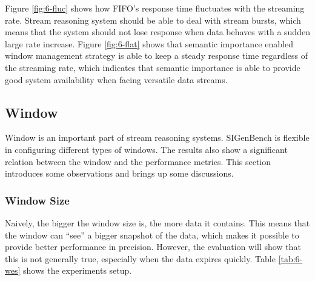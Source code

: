 Figure \ref{fig:6-fluc} shows how FIFO's response time fluctuates with the streaming rate.
Stream reasoning system should be able to deal with stream bursts, which means that the system should not lose response when data behaves with a sudden large rate increase. 
Figure \ref{fig:6-flat} shows that semantic importance enabled window management strategy is able to keep a steady response time regardless of the streaming rate, which indicates that semantic importance is able to provide good system availability when facing versatile data streams. 
%
\subsection{Window}
Window is an important part of stream reasoning systems. 
SIGenBench is flexible in configuring different types of windows.
The results also show a significant relation between the window and the performance metrics.
This section introduces some observations and brings up some discussions. 
%
\subsubsection{Window Size}
Naively, the bigger the window size is, the more data it contains.
This means that the window can ``see'' a bigger snapshot of the data, which makes it possible to provide better performance in precision. 
However, the evaluation will show that this is not generally true, especially when the data expires quickly. 
Table \ref{tab:6-wes} shows the experiments setup.

